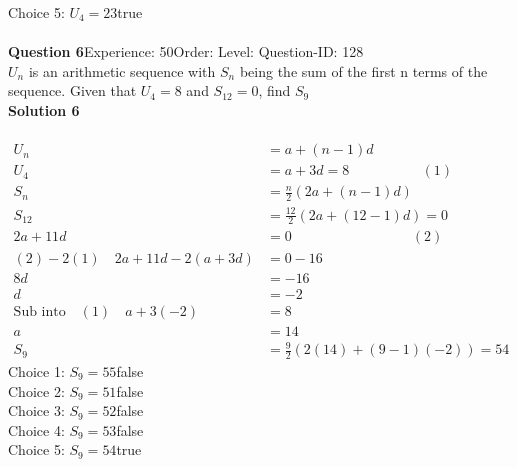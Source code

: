 \documentclass{article}
\begin{document}
Choice 5: \hspace{20pt}$U_{4}=23$\hspace{20pt}true\\
\\[4pt]
\noindent\textbf{Question 6}\hspace{20pt}Experience: 50\hspace{20pt}Order: \hspace{20pt}Level: \hspace{20pt}Question-ID: 128\\[2pt]
$U_n$ is an arithmetic sequence with $S_n$ being the sum of the first n terms of the sequence. Given that $U_{4}=8$ and $S_{12}=0$, find $S_{9}$\\[4pt]
\noindent\textbf{Solution 6}\\[2pt]
\\[-35pt]\begin{align*}
U_n&=a+(n-1)d\\[2pt]
U_4&=a+3d=8 \hspace{62pt} (1)\\[2pt]
S_n&=\displaystyle\frac{n}{2}(2a+(n-1)d)\\[2pt]
S_{12}&=\displaystyle\frac{12}{2}(2a+(12-1)d)=0\\[2pt]
2a+11d&=0\hspace{103pt} (2)\\[2pt]
(2)-2(1) \quad 2a+11d-2(a+3d)&=0-16\\[2pt]
8d&=-16\\[2pt]
d&=-2\\[2pt]
\text{Sub into}\quad (1) \quad a+3(-2)&=8\\[2pt]
a&=14\\[12pt]
S_9&=\displaystyle\frac{9}{2}(2(14)+(9-1)(-2))=54
\end{align*}
Choice 1: \hspace{20pt}$S_{9}=55$\hspace{20pt}false\\
Choice 2: \hspace{20pt}$S_{9}=51$\hspace{20pt}false\\
Choice 3: \hspace{20pt}$S_{9}=52$\hspace{20pt}false\\
Choice 4: \hspace{20pt}$S_{9}=53$\hspace{20pt}false\\
Choice 5: \hspace{20pt}$S_{9}=54$\hspace{20pt}true\\
\end{document}
